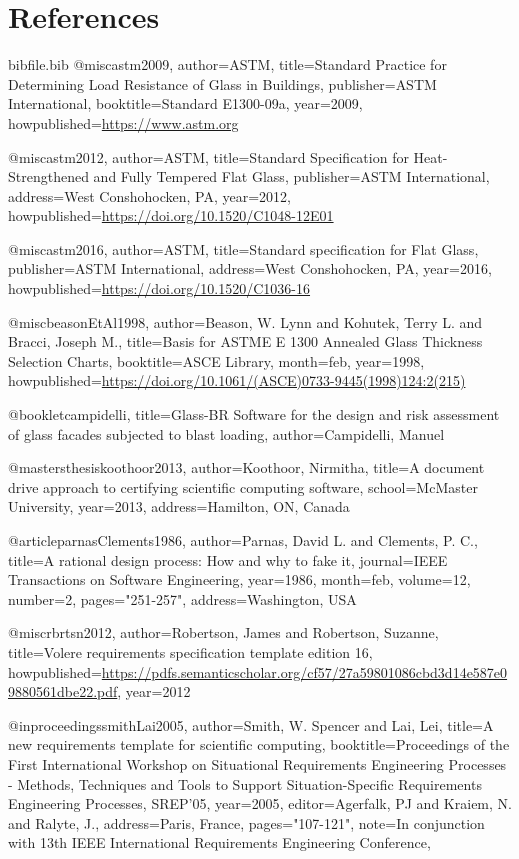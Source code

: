 \documentclass[12pt]{article}
\begin{document}
\section{References}
\label{Sec:References}
\begin{filecontents*}{bibfile.bib}
@misc{astm2009,
author={ASTM},
title={Standard Practice for Determining Load Resistance of Glass in Buildings},
publisher={ASTM International},
booktitle={Standard E1300-09a},
year={2009},
howpublished={\url{https://www.astm.org}}}

@misc{astm2012,
author={ASTM},
title={Standard Specification for Heat-Strengthened and Fully Tempered Flat Glass},
publisher={ASTM International},
address={West Conshohocken, PA},
year={2012},
howpublished={\url{https://doi.org/10.1520/C1048-12E01}}}

@misc{astm2016,
author={ASTM},
title={Standard specification for Flat Glass},
publisher={ASTM International},
address={West Conshohocken, PA},
year={2016},
howpublished={\url{https://doi.org/10.1520/C1036-16}}}

@misc{beasonEtAl1998,
author={Beason, W. Lynn and Kohutek, Terry L. and Bracci, Joseph M.},
title={Basis for ASTME E 1300 Annealed Glass Thickness Selection Charts},
booktitle={ASCE Library},
month=feb,
year={1998},
howpublished={\url{https://doi.org/10.1061/(ASCE)0733-9445(1998)124:2(215)}}}

@booklet{campidelli,
title={Glass-BR Software for the design and risk assessment of glass facades subjected to blast loading},
author={Campidelli, Manuel}}

@mastersthesis{koothoor2013,
author={Koothoor, Nirmitha},
title={A document drive approach to certifying scientific computing software},
school={McMaster University},
year={2013},
address={Hamilton, ON, Canada}}

@article{parnasClements1986,
author={Parnas, David L. and Clements, P. C.},
title={A rational design process: How and why to fake it},
journal={IEEE Transactions on Software Engineering},
year={1986},
month=feb,
volume={12},
number={2},
pages={"251-257"},
address={Washington, USA}}

@misc{rbrtsn2012,
author={Robertson, James and Robertson, Suzanne},
title={Volere requirements specification template edition 16},
howpublished={\url{https://pdfs.semanticscholar.org/cf57/27a59801086cbd3d14e587e09880561dbe22.pdf}},
year={2012}}

@inproceedings{smithLai2005,
author={Smith, W. Spencer and Lai, Lei},
title={A new requirements template for scientific computing},
booktitle={Proceedings of the First International Workshop on Situational Requirements Engineering Processes - Methods, Techniques and Tools to Support Situation-Specific Requirements Engineering Processes, SREP'05},
year={2005},
editor={Agerfalk, PJ and Kraiem, N. and Ralyte, J.},
address={Paris, France},
pages={"107-121"},
note={In conjunction with 13th IEEE International Requirements Engineering Conference,}}
\end{filecontents*}
\nocite{*}
\printbibliography[heading=none]
\end{document}

